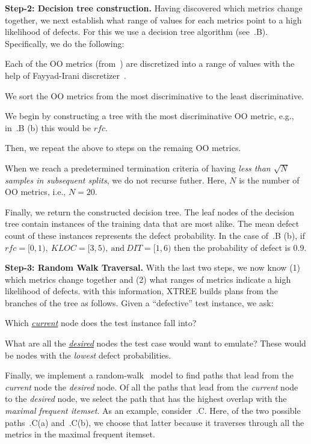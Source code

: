 \noindent\textbf{Step-2: Decision tree construction.} Having discovered which metrics change together, we next establish what range of values for each metrics point to a high likelihood of defects. For this we use a decision tree algorithm (see~.B). Specifically, we do the following: 
\be[wide=0pt]
\item Each of the OO metrics (from~) are discretized into a range of values with the help of Fayyad-Irani discretizer~\citep{fi}.
\item We sort the OO metrics from the most discriminative  to the least discriminative.
\item We begin by constructing a tree with the most discriminative OO metric, e.g., in~.B (b) this would be $\mathit{rfc}$.
\item Then, we repeat the above to steps on the remaing OO metrics. 
\item {} {\color{steel} When we reach a predetermined termination criteria of having \textit{less than $\sqrt{N}$ samples in subsequent splits}, we do not recurse futher. Here, $N$ is the number of OO metrics, i.e., $N=20$.}
\item Finally, we return the constructed decision tree.  
\ee
{} {\color{steel} The leaf nodes of the decision tree contain instances of the training data that are most alike. The mean defect count of these instances represents the defect probability. In the case of~.B (b), if $\mathit{rfc}=[0,1),~\mathit{KLOC}=[3,5),~\text{and}~\mathit{DIT}=[1,6)$ then the probability of defect is $0.9$}. 

\noindent\textbf{Step-3: Random Walk Traversal.} With the last two steps, we now know (1) which metrics change together and (2) what ranges of metrics indicate a high likelihood of defects. with this information, XTREE builds plans from the branches of the tree as follows. Given a ``defective'' test instance, we ask:
\be
\item
Which \underline{\textit{current}} node does the test instance fall into?
\item What are all the \underline{\textit{desired}} nodes the test case would want to emulate? These would be nodes with the \textit{lowest} defect probabilities.
\ee

Finally, we implement a random-walk~\citep{ying2018graph, sharma2016graphjet} model to find paths that lead from the \textit{current} node the \textit{desired} node. Of all the paths that lead from the \textit{current} node to the \textit{desired} node, we select the path that has the highest overlap with the \textit{maximal frequent itemset}. As an example, consider~.C. Here, of the two possible paths~.C(a) and~.C(b), we choose that latter because it traverses through all the metrics in the maximal frequent itemset.

